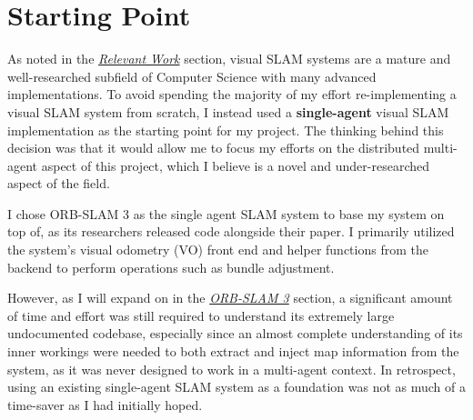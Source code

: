 




\label{sec:2}

\section{Starting Point}
\label{sec:starting-point}
As noted in the \hyperref[sec:relevant-work]{\textit{Relevant Work}} section, visual SLAM systems are a mature and well-researched subfield of Computer Science with many advanced implementations. To avoid spending the majority of my effort re-implementing a visual SLAM system from scratch, I instead used a \textbf{single-agent} visual SLAM implementation as the starting point for my project. The thinking behind this decision was that it would allow me to focus my efforts on the distributed multi-agent aspect of this project, which I believe is a novel and under-researched aspect of the field.

I chose ORB-SLAM 3 as the single agent SLAM system to base my system on top of, as its researchers released code alongside their paper. I primarily utilized the system's visual odometry (VO) front end and helper functions from the backend to perform operations such as bundle adjustment.

However, as I will expand on in the \hyperref[sec:orb-slam-3]{\textit{ORB-SLAM 3}} section, a significant amount of time and effort was still required to understand its extremely large undocumented codebase, especially since an almost complete understanding of its inner workings were needed to both extract and inject map information from the system, as it was never designed to work in a multi-agent context. In retrospect, using an existing single-agent SLAM system as a foundation was not as much of a time-saver as I had initially hoped.

